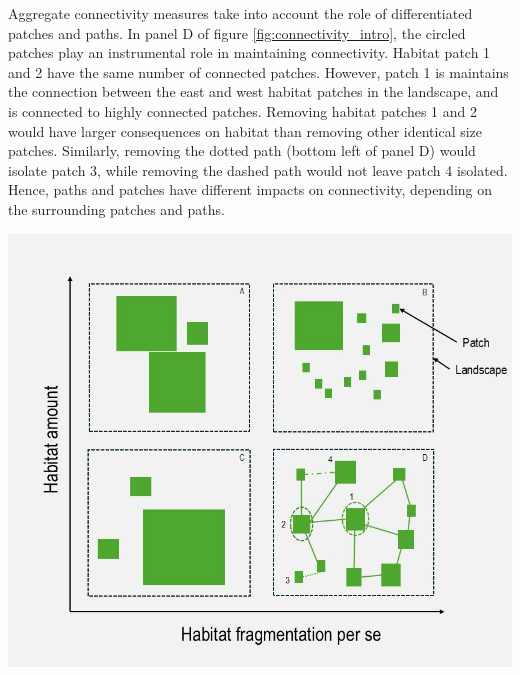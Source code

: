 \begin{tcolorbox}[breakable, 
colback =verylightgray, 
colframe=gray!75!black,
title={Box 2 - Habitat Loss, Fragmentation and Connectivity},
fontupper=\small]
 Aggregate connectivity measures take into account the role of differentiated patches and paths. In panel D of figure \ref{fig:connectivity_intro}, the circled patches play an instrumental role in maintaining connectivity. Habitat patch 1 and 2 have the same number of connected patches. However, patch 1 is maintains the connection between the east and west habitat patches in the landscape, and is connected to highly connected patches. Removing habitat patches 1 and 2 would have larger consequences on habitat than removing other identical size patches. Similarly, removing the dotted path (bottom left of panel D) would isolate patch 3, while removing the dashed path would not leave patch 4 isolated. Hence, paths and patches have different impacts on connectivity, depending on the surrounding patches and paths.
\\%
\begin{center}
\includegraphics[width = .8\textwidth]{figures/intro/fragmentation.jpg}
\label{fig:connectivity_intro}
\end{center}
\end{tcolorbox}
\clearpage
	
